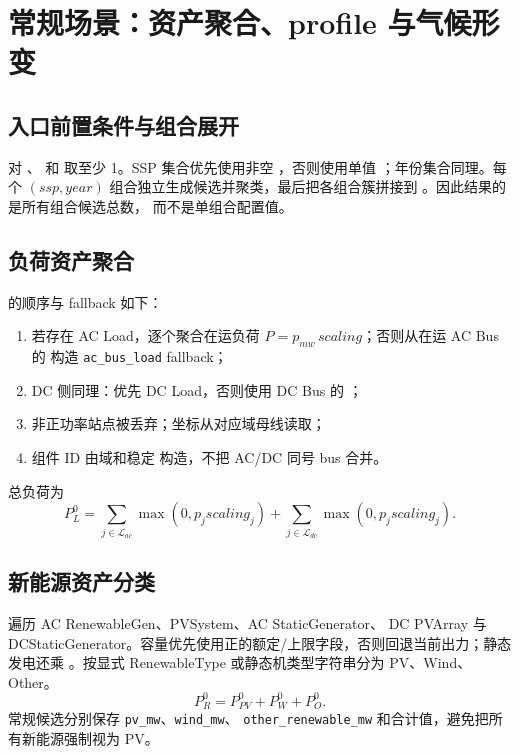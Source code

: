 \section{常规场景：资产聚合、profile 与气候形变}
\label{sec:regular-implementation}

\subsection{入口前置条件与组合展开}
 对 、 和
 取至少 1。SSP 集合优先使用非空 ，否则使用单值
；年份集合同理。每个 $(ssp,year)$ 组合独立生成候选并聚类，最后把各组合簇拼接到
。因此结果的  是所有组合候选总数，
而不是单组合配置值。

\subsection{负荷资产聚合}
 的顺序与 fallback 如下：
\begin{enumerate}
  \item 若存在 AC Load，逐个聚合在运负荷 $P=p_{mw}\,scaling$；否则从在运 AC Bus 的
         构造 \texttt{ac\_bus\_load} fallback；
  \item DC 侧同理：优先 DC Load，否则使用 DC Bus 的 ；
  \item 非正功率站点被丢弃；坐标从对应域母线读取；
  \item 组件 ID 由域和稳定  构造，不把 AC/DC 同号 bus 合并。
\end{enumerate}
总负荷为
\begin{equation}
 P_L^0=\sum_{j\in\mathcal L_{ac}}\max(0,p_j scaling_j)
       +\sum_{j\in\mathcal L_{dc}}\max(0,p_j scaling_j).
\end{equation}

\subsection{新能源资产分类}
 遍历 AC RenewableGen、PVSystem、AC StaticGenerator、
DC PVArray 与 DCStaticGenerator。容量优先使用正的额定/上限字段，否则回退当前出力；静态
发电还乘 。按显式 RenewableType 或静态机类型字符串分为 PV、Wind、Other。
\begin{equation}
 P_R^0=P_{PV}^0+P_W^0+P_O^0.
\end{equation}
常规候选分别保存 \texttt{pv\_mw}、\texttt{wind\_mw}、
\texttt{other\_renewable\_mw} 和合计值，避免把所有新能源强制视为 PV。

